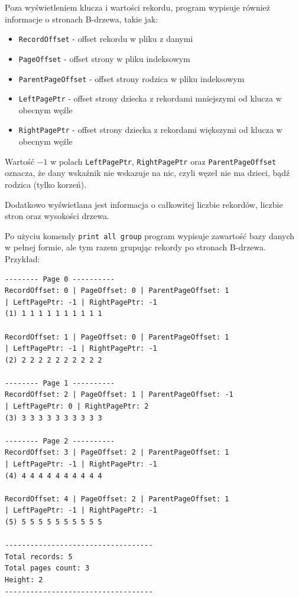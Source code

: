 \documentclass[12pt]{article}
\begin{document}
Poza wyświetleniem klucza i wartości rekordu, program wypisuje również informacje o stronach B-drzewa, 
takie jak:
\begin{itemize}
    \item \verb!RecordOffset! - offset rekordu w pliku z danymi
    \item \verb!PageOffset! - offset strony w pliku indeksowym
    \item \verb!ParentPageOffset! - offset strony rodzica w pliku indeksowym
    \item \verb!LeftPagePtr! - offset strony dziecka z rekordami mniejszymi od klucza w obecnym węźle
    \item \verb!RightPagePtr! - offset strony dziecka z rekordami większymi od klucza w obecnym węźle
\end{itemize}

Wartość \(-1\) w polach \verb!LeftPagePtr!, \verb!RightPagePtr! oraz \verb!ParentPageOffset! oznacza, 
że dany wskaźnik nie wskazuje na nic, czyli węzeł nie ma dzieci, bądź rodzica (tylko korzeń).

Dodatkowo wyświetlana jest informacja o całkowitej liczbie rekordów, 
liczbie stron oraz wysokości drzewa.


Po użyciu komendy \verb!print all group! program wypisuje zawartość bazy danych w pełnej formie, 
ale tym razem grupując rekordy po stronach B-drzewa. Przykład:
\begin{tcolorbox}[colframe=black!75, colback=white!95, title=Output komendy \texttt{print all group}]
\begin{verbatim}
-------- Page 0 ----------
RecordOffset: 0 | PageOffset: 0 | ParentPageOffset: 1 
| LeftPagePtr: -1 | RightPagePtr: -1
(1) 1 1 1 1 1 1 1 1 1 1 

RecordOffset: 1 | PageOffset: 0 | ParentPageOffset: 1 
| LeftPagePtr: -1 | RightPagePtr: -1
(2) 2 2 2 2 2 2 2 2 2 2 

-------- Page 1 ----------
RecordOffset: 2 | PageOffset: 1 | ParentPageOffset: -1 
| LeftPagePtr: 0 | RightPagePtr: 2
(3) 3 3 3 3 3 3 3 3 3 3 

-------- Page 2 ----------
RecordOffset: 3 | PageOffset: 2 | ParentPageOffset: 1 
| LeftPagePtr: -1 | RightPagePtr: -1
(4) 4 4 4 4 4 4 4 4 4 4 

RecordOffset: 4 | PageOffset: 2 | ParentPageOffset: 1 
| LeftPagePtr: -1 | RightPagePtr: -1
(5) 5 5 5 5 5 5 5 5 5 5 

-----------------------------------
Total records: 5
Total pages count: 3
Height: 2
-----------------------------------
\end{verbatim}
\end{tcolorbox}
\end{document}
